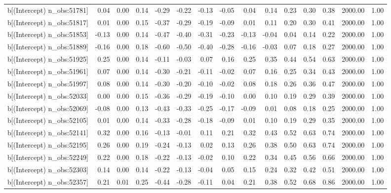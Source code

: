 \begin{table}[ht]
\begin{tabular}{rrrrrrrrrrrrrrr}
  b[(Intercept) n\_obs:51781] & 0.04 & 0.00 & 0.14 & -0.29 & -0.22 & -0.13 & -0.05 & 0.04 & 0.14 & 0.23 & 0.30 & 0.38 & 2000.00 & 1.00 \\ 
  b[(Intercept) n\_obs:51817] & 0.01 & 0.00 & 0.15 & -0.37 & -0.29 & -0.19 & -0.09 & 0.01 & 0.11 & 0.20 & 0.30 & 0.41 & 2000.00 & 1.00 \\ 
  b[(Intercept) n\_obs:51853] & -0.13 & 0.00 & 0.14 & -0.47 & -0.40 & -0.31 & -0.23 & -0.13 & -0.04 & 0.04 & 0.14 & 0.22 & 2000.00 & 1.00 \\ 
  b[(Intercept) n\_obs:51889] & -0.16 & 0.00 & 0.18 & -0.60 & -0.50 & -0.40 & -0.28 & -0.16 & -0.03 & 0.07 & 0.18 & 0.27 & 2000.00 & 1.00 \\ 
  b[(Intercept) n\_obs:51925] & 0.25 & 0.00 & 0.14 & -0.11 & -0.03 & 0.07 & 0.16 & 0.25 & 0.35 & 0.44 & 0.54 & 0.63 & 2000.00 & 1.00 \\ 
  b[(Intercept) n\_obs:51961] & 0.07 & 0.00 & 0.14 & -0.30 & -0.21 & -0.11 & -0.02 & 0.07 & 0.16 & 0.25 & 0.34 & 0.43 & 2000.00 & 1.00 \\ 
  b[(Intercept) n\_obs:51997] & 0.08 & 0.00 & 0.14 & -0.30 & -0.20 & -0.10 & -0.02 & 0.08 & 0.18 & 0.26 & 0.36 & 0.47 & 2000.00 & 1.00 \\ 
  b[(Intercept) n\_obs:52033] & 0.00 & 0.00 & 0.15 & -0.36 & -0.29 & -0.19 & -0.10 & 0.00 & 0.10 & 0.19 & 0.29 & 0.39 & 2000.00 & 1.00 \\ 
  b[(Intercept) n\_obs:52069] & -0.08 & 0.00 & 0.13 & -0.43 & -0.33 & -0.25 & -0.17 & -0.09 & 0.01 & 0.08 & 0.18 & 0.25 & 2000.00 & 1.00 \\ 
  b[(Intercept) n\_obs:52105] & 0.01 & 0.00 & 0.14 & -0.33 & -0.28 & -0.18 & -0.09 & 0.01 & 0.10 & 0.19 & 0.29 & 0.35 & 2000.00 & 1.00 \\ 
  b[(Intercept) n\_obs:52141] & 0.32 & 0.00 & 0.16 & -0.13 & -0.01 & 0.11 & 0.21 & 0.32 & 0.43 & 0.52 & 0.63 & 0.74 & 2000.00 & 1.00 \\ 
  b[(Intercept) n\_obs:52195] & 0.26 & 0.00 & 0.19 & -0.24 & -0.13 & 0.02 & 0.13 & 0.26 & 0.38 & 0.50 & 0.63 & 0.74 & 2000.00 & 1.00 \\ 
  b[(Intercept) n\_obs:52249] & 0.22 & 0.00 & 0.18 & -0.22 & -0.13 & -0.02 & 0.10 & 0.22 & 0.34 & 0.45 & 0.56 & 0.66 & 2000.00 & 1.00 \\ 
  b[(Intercept) n\_obs:52303] & 0.14 & 0.00 & 0.14 & -0.22 & -0.13 & -0.04 & 0.05 & 0.15 & 0.24 & 0.32 & 0.42 & 0.51 & 2000.00 & 1.00 \\ 
  b[(Intercept) n\_obs:52357] & 0.21 & 0.01 & 0.25 & -0.44 & -0.28 & -0.11 & 0.04 & 0.21 & 0.38 & 0.52 & 0.68 & 0.86 & 2000.00 & 1.00 \\ 

\end{tabular}
\end{table}
